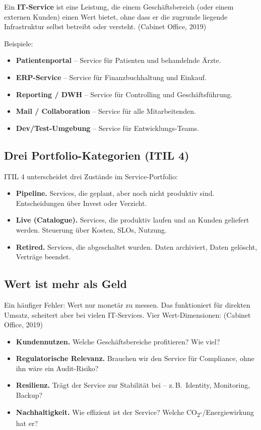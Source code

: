 \documentclass[11pt,a4paper,oneside]{article}
\newcommand{\fachbegriff}[1]{\textbf{#1}}
\newcommand{\quelle}[1]{{\footnotesize\color{lpGray}(#1)}}
\begin{document}
Ein \fachbegriff{IT-Service} ist eine Leistung, die einem Geschäftsbereich (oder einem externen Kunden) einen Wert bietet, ohne dass er die zugrunde liegende Infrastruktur selbst betreibt oder versteht. \quelle{Cabinet Office, 2019}

Beispiele:

\begin{itemize}
  \item \textbf{Patientenportal} -- Service für Patienten und behandelnde Ärzte.
  \item \textbf{ERP-Service} -- Service für Finanzbuchhaltung und Einkauf.
  \item \textbf{Reporting / DWH} -- Service für Controlling und Geschäftsführung.
  \item \textbf{Mail / Collaboration} -- Service für alle Mitarbeitenden.
  \item \textbf{Dev/Test-Umgebung} -- Service für Entwicklungs-Teams.
\end{itemize}

\subsection{Drei Portfolio-Kategorien (ITIL 4)}

ITIL 4 unterscheidet drei Zustände im Service-Portfolio:

\begin{itemize}
  \item \fachbegriff{Pipeline.} Services, die geplant, aber noch nicht produktiv sind. Entscheidungen über Invest oder Verzicht.
  \item \fachbegriff{Live (Catalogue).} Services, die produktiv laufen und an Kunden geliefert werden. Steuerung über Kosten, SLOs, Nutzung.
  \item \fachbegriff{Retired.} Services, die abgeschaltet wurden. Daten archiviert, Daten gelöscht, Verträge beendet.
\end{itemize}

\subsection{Wert ist mehr als Geld}

Ein häufiger Fehler: Wert nur monetär zu messen. Das funktioniert für direkten Umsatz, scheitert aber bei vielen IT-Services. Vier Wert-Dimensionen: \quelle{Cabinet Office, 2019}

\begin{itemize}
  \item \textbf{Kundennutzen.} Welche Geschäftsbereiche profitieren? Wie viel?
  \item \textbf{Regulatorische Relevanz.} Brauchen wir den Service für Compliance, ohne ihn wäre ein Audit-Risiko?
  \item \textbf{Resilienz.} Trägt der Service zur Stabilität bei -- z.\,B.\ Identity, Monitoring, Backup?
  \item \textbf{Nachhaltigkeit.} Wie effizient ist der Service? Welche CO\textsubscript{2}-/Energiewirkung hat er?
\end{itemize}
\end{document}
